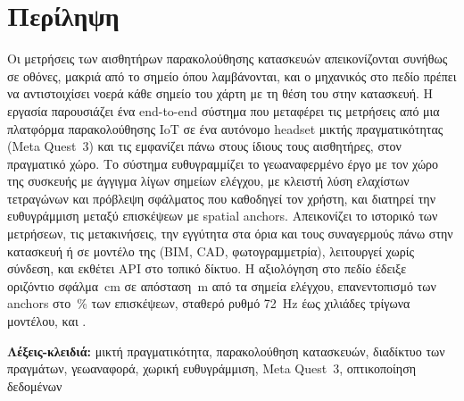 \chapter*{Περίληψη}

Οι μετρήσεις των αισθητήρων παρακολούθησης κατασκευών απεικονίζονται συνήθως σε οθόνες, μακριά από το σημείο όπου λαμβάνονται, και ο μηχανικός στο πεδίο πρέπει να αντιστοιχίσει νοερά κάθε σημείο του χάρτη με τη θέση του στην κατασκευή. Η εργασία παρουσιάζει ένα end-to-end σύστημα που μεταφέρει τις μετρήσεις από μια πλατφόρμα παρακολούθησης IoT σε ένα αυτόνομο headset μικτής πραγματικότητας (Meta Quest~3) και τις εμφανίζει πάνω στους ίδιους τους αισθητήρες, στον πραγματικό χώρο. Το σύστημα ευθυγραμμίζει το γεωαναφερμένο έργο με τον χώρο της συσκευής με άγγιγμα λίγων σημείων ελέγχου, με κλειστή λύση ελαχίστων τετραγώνων και πρόβλεψη σφάλματος που καθοδηγεί τον χρήστη, και διατηρεί την ευθυγράμμιση μεταξύ επισκέψεων με spatial anchors. Απεικονίζει το ιστορικό των μετρήσεων, τις μετακινήσεις, την εγγύτητα στα όρια και τους συναγερμούς πάνω στην κατασκευή ή σε μοντέλο της (BIM, CAD, φωτογραμμετρία), λειτουργεί χωρίς σύνδεση, και εκθέτει API στο τοπικό δίκτυο. Η αξιολόγηση στο πεδίο έδειξε οριζόντιο σφάλμα \,cm σε απόσταση \,m από τα σημεία ελέγχου, επανεντοπισμό των anchors στο \,\% των επισκέψεων, σταθερό ρυθμό \SI{72}{Hz} έως  χιλιάδες τρίγωνα μοντέλου, και .


\vspace{1em}
\noindent\textbf{Λέξεις-κλειδιά:} μικτή πραγματικότητα, παρακολούθηση κατασκευών, διαδίκτυο των πραγμάτων, γεωαναφορά, χωρική ευθυγράμμιση, Meta Quest~3, οπτικοποίηση δεδομένων

